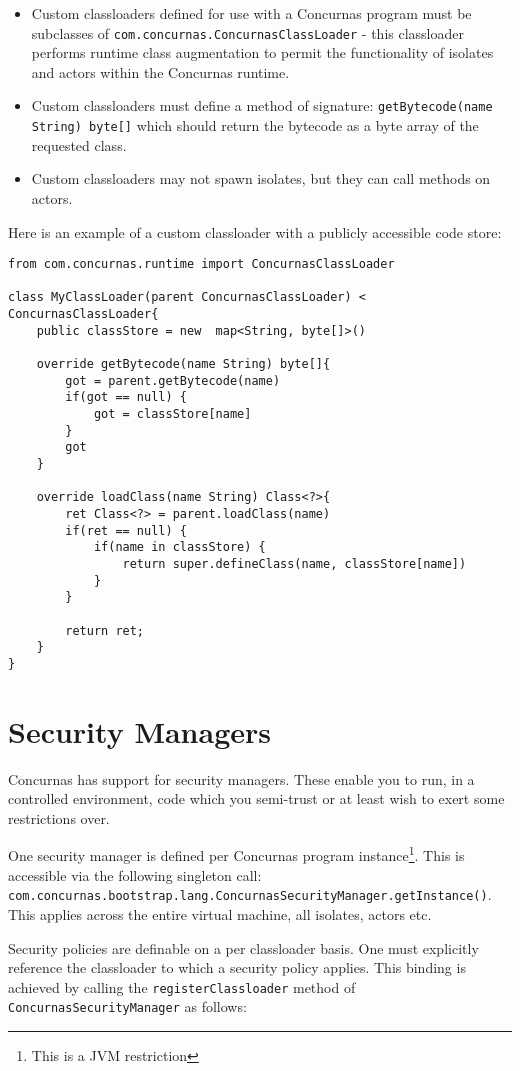 \documentclass[conc-doc]{subfiles}
\begin{document}
\begin{itemize}
	\item Custom classloaders defined for use with a Concurnas program must be subclasses of \lstinline{com.concurnas.ConcurnasClassLoader} - this classloader performs runtime class augmentation to permit the functionality of isolates and actors within the Concurnas runtime.
	\item Custom classloaders must define a method of signature: \lstinline{getBytecode(name String) byte[]} which should return the bytecode as a byte array of the requested class.
	\item Custom classloaders may not spawn isolates, but they can call methods on actors.
\end{itemize}

Here is an example of a custom classloader with a publicly accessible code store:

\begin{lstlisting}
from com.concurnas.runtime import ConcurnasClassLoader

class MyClassLoader(parent ConcurnasClassLoader) < ConcurnasClassLoader{
	public classStore = new  map<String, byte[]>()
	
	override getBytecode(name String) byte[]{
		got = parent.getBytecode(name)
		if(got == null) {
			got = classStore[name]
		}
		got
	}
	
	override loadClass(name String) Class<?>{
		ret Class<?> = parent.loadClass(name)
		if(ret == null) {
			if(name in classStore) {
				return super.defineClass(name, classStore[name])
			}
		}
		
		return ret;
	}
}
\end{lstlisting}

\section{Security Managers}
\label{sec:Security Managers}
Concurnas has support for security managers. These enable you to run, in a controlled environment, code which you semi-trust or at least wish to exert some restrictions over.

One security manager is defined per Concurnas program instance\footnote{This is a JVM restriction}. This is accessible via the following singleton call: \lstinline{com.concurnas.bootstrap.lang.ConcurnasSecurityManager.getInstance()}. This applies across the entire virtual machine, all isolates, actors etc.

Security policies are definable on a per classloader basis. One must explicitly reference the classloader to which a security policy applies. This binding is achieved by calling the \lstinline{registerClassloader} method of \lstinline{ConcurnasSecurityManager} as follows:
\end{document}
